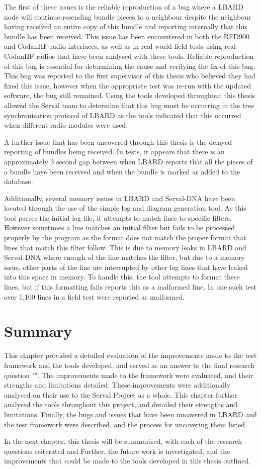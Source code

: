 The first of these issues is the reliable reproduction of a bug where a LBARD node will continue resending bundle pieces to a neighbour despite the neighbour having received an entire copy of this bundle and reporting internally that this bundle has been received.
This issue has been encountered in both the RFD900 and CodanHF radio interfaces, as well as in real-world field tests using real CodanHF radios that have been analysed with these tools.
Reliable reproduction of this bug is essential for determining the cause and verifying the fix of this bug.
This bug was reported to the first supervisor of this thesis who believed they had fixed this issue, however when the appropriate test was re-run with the updated software, the bug still remained.
Using the tools developed throughout this thesis allowed the Serval team to determine that this bug must be occurring in the tree synchronisation protocol of LBARD as the tools indicated that this occurred when different radio modules were used.

A further issue that has been uncovered through this thesis is the delayed reporting of bundles being received.
In tests, it appears that there is an approximately 3 second gap between when LBARD reports that all the pieces of a bundle have been received and when the bundle is marked as added to the database.

Additionally, several memory issues in LBARD and Serval-DNA have been located through the use of the simple log and diagram generation tool.
As this tool parses the initial log file, it attempts to match lines to specific filters.
However sometimes a line matches an initial filter but fails to be processed properly by the program as the format does not match the proper format that lines that match this filter follow.
This is due to memory leaks in LBARD and Serval-DNA where enough of the line matches the filter, but due to a memory issue, other parts of the line are interrupted by other log lines that have leaked into this space in memory.
To handle this, the tool attempts to format these lines, but if this formatting fails reports this as a malformed line.
In one such test over 1,100 lines in a field test were reported as malformed.


\section{Summary}
This chapter provided a detailed evaluation of the improvements made to the test framework and the tools developed, and served as an answer to the final research question "\fourthRQ".
The improvements made to the framework were evaluated, and their strengths and limitations detailed.
These improvements were additionally analysed on their use to the Serval Project as a whole.
This chapter further analysed the tools throughout this project, and detailed their strengths and limitations.
Finally, the bugs and issues that have been uncovered in LBARD and the test framework were described, and the process for uncovering them listed.

In the next chapter, this thesis will be summarised, with each of the research questions reiterated and 
Further, the future work is investigated, and the improvements that could be made to the tools developed in this thesis outlined.